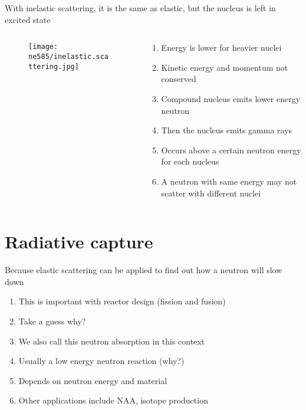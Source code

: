 \documentclass[aspectratio=1610,pdftex,dvipsnames,compress,xcolor={dvipsnames}]{beamer}
\begin{document}
\addtocounter{framenumber}{-1} 
\begin{frame}{With inelastic scattering, it is the same as elastic, but the nucleus is left in excited state}
    \begin{columns}[t]

        \begin{column}{0.50\textwidth}
            \begin{figure}
                \centering
                \texttt{[image: ne585/inelastic.scattering.jpg]}
            \end{figure}
        \end{column}

        \begin{column}{0.50\textwidth}
            \begin{enumerate}[series=outerlist,topsep=0pt,itemsep=12pt,leftmargin=*,label=(\arabic*)]
                \item[]Energy is lower for heavier nuclei
                \item[]Kinetic energy and momentum not conserved
                \item[]Compound nucleus emits lower energy neutron
                \item[]Then the nucleus emits gamma rays
                \item[]Occurs above a certain neutron energy for each nucleus
                \item[]A neutron with same energy may not scatter with different nuclei
            \end{enumerate}
        \end{column}

    \end{columns}
\end{frame}


\section{Radiative capture}


\addtocounter{framenumber}{-1} 
\begin{frame}{Because elastic scattering can be applied to find out how a neutron will slow down}
    \begin{enumerate}[series=outerlist,topsep=0pt,itemsep=21pt,leftmargin=*,label=(\arabic*)]
        \item[]This is important with reactor design (fission and fusion)
        \item[]Take a guess why?
        \item[]We also call this neutron absorption in this context
        \item[]Usually a low energy neutron reaction (why?)
        \item[]Depends on neutron energy and material
        \item[]Other applications include NAA, isotope production
    \end{enumerate}
\end{frame}
\end{document}

